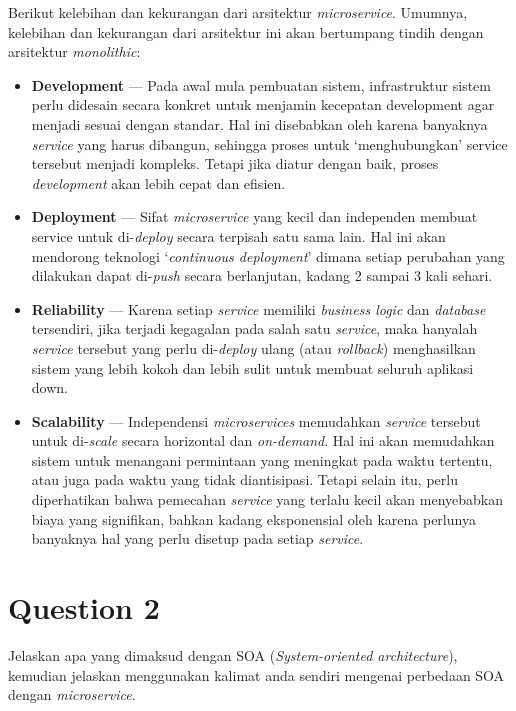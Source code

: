 \documentclass[
	11pt, %
	indonesian
]{assignment}
\begin{document}
Berikut kelebihan dan kekurangan dari arsitektur \textit{microservice}. Umumnya, kelebihan dan kekurangan dari arsitektur ini akan bertumpang tindih dengan arsitektur \textit{monolithic}:

\begin{itemize}
	\item \textbf{Development} --- Pada awal mula pembuatan sistem, infrastruktur sistem perlu didesain secara konkret untuk menjamin kecepatan development agar menjadi sesuai dengan standar. Hal ini disebabkan oleh karena banyaknya \textit{service} yang harus dibangun, sehingga proses untuk `menghubungkan' service tersebut menjadi kompleks. Tetapi jika diatur dengan baik, proses \textit{development} akan lebih cepat dan efisien.
	\item \textbf{Deployment} --- Sifat \textit{microservice} yang kecil dan independen membuat service untuk di-\textit{deploy} secara terpisah satu sama lain. Hal ini akan mendorong teknologi `\textit{continuous deployment}' dimana setiap perubahan yang dilakukan dapat di-\textit{push} secara berlanjutan, kadang 2 sampai 3 kali sehari.
	\item \textbf{Reliability} --- Karena setiap \textit{service} memiliki \textit{business logic} dan \textit{database} tersendiri, jika terjadi kegagalan pada salah satu \textit{service}, maka hanyalah \textit{service} tersebut yang perlu di-\textit{deploy} ulang (atau \textit{rollback}) menghasilkan sistem yang lebih kokoh dan lebih sulit untuk membuat seluruh aplikasi down.
	\item \textbf{Scalability} --- Independensi \textit{microservices} memudahkan \textit{service} tersebut untuk di-\textit{scale} secara horizontal dan \textit{on-demand}. Hal ini akan memudahkan sistem untuk menangani permintaan yang meningkat pada waktu tertentu, atau juga pada waktu yang tidak diantisipasi. Tetapi selain itu, perlu diperhatikan bahwa pemecahan \textit{service} yang terlalu kecil akan menyebabkan biaya yang signifikan, bahkan kadang eksponensial oleh karena perlunya banyaknya hal yang perlu disetup pada setiap \textit{service}.

\end{itemize}


\section*{Question 2}
\begin{problem}
Jelaskan apa yang dimaksud dengan SOA (\textit{System-oriented architecture}), kemudian jelaskan menggunakan kalimat anda sendiri mengenai perbedaan SOA dengan \textit{microservice}.
\end{problem}
\end{document}

